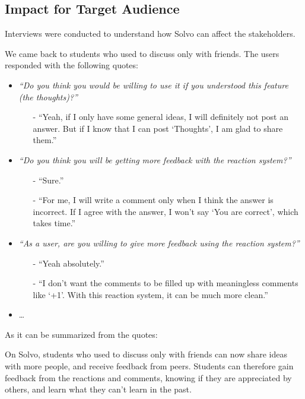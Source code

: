 \documentclass[a4paper]{article}
\begin{document}
    \subsection*{Impact for Target Audience}

    Interviews were conducted to understand how Solvo can affect the stakeholders.

    We came back to students who used to discuss only with friends.
    The users responded with the following quotes:
    \begin{itemize}
        \item \textit{``Do you think you would be willing to use it if you understood this feature (the thoughts)?''}
        \begin{itemize}
            \item[-] ``Yeah, if I only have some general ideas, I will definitely not post an answer.
            But if I know that I can post `Thoughts', I am glad to share them.''
        \end{itemize}

        \item \textit{``Do you think you will be getting more feedback with the reaction system?''}
        \begin{itemize}
            \item[-] ``Sure.''
            \item[-] ``For me, I will write a comment only when I think the answer is incorrect.
            If I agree with the answer, I won't say `You are correct', which takes time.''
        \end{itemize}

        \item
        \textit{``As a user, are you willing to give more feedback using the reaction system?''}
        \begin{itemize}
            \item[-] ``Yeah absolutely.''
            \item[-] ``I don’t want the comments to be filled up with meaningless comments like `+1'.
            With this reaction system, it can be much more clean.''
        \end{itemize}
        \item \ldots
    \end{itemize}

    As it can be summarized from the quotes:

    On Solvo, students who used to discuss only with friends can now share ideas with more people, and receive feedback from peers.
    Students can therefore gain feedback from the reactions and comments, knowing if they are appreciated by others,
    and learn what they can't learn in the past.
\end{document}
